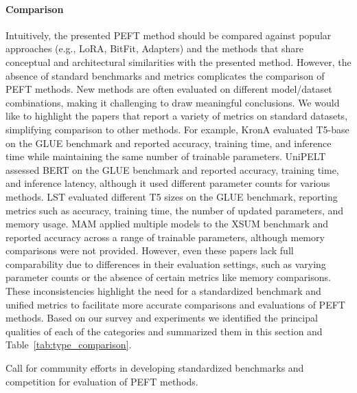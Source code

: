 \paragraph{Comparison} 
Intuitively, the presented PEFT method should be compared against popular approaches (e.g., LoRA, BitFit, Adapters) and the methods that share conceptual and architectural similarities with the presented method. However, the absence of standard benchmarks and metrics complicates the comparison of PEFT methods. New methods are often evaluated on different model/dataset combinations, making it challenging to draw meaningful conclusions. We would like to highlight the papers that report a variety of metrics on standard datasets, simplifying comparison to other methods. For example, KronA \citep{krona} evaluated T5-base on the GLUE benchmark and reported accuracy, training time, and inference time while maintaining the same number of trainable parameters. UniPELT \citep{unipelt} assessed BERT on the GLUE benchmark and reported accuracy, training time, and inference latency, although it used different parameter counts for various methods. LST \citep{ladder_side_tuning} evaluated different T5 sizes on the GLUE benchmark, reporting metrics such as accuracy, training time, the number of updated parameters, and memory usage. MAM \citep{parallel_adapter} applied multiple models to the XSUM benchmark and reported accuracy across a range of trainable parameters, although memory comparisons were not provided. However, even these papers lack full comparability due to differences in their evaluation settings, such as varying parameter counts or the absence of certain metrics like memory comparisons. These inconsistencies highlight the need for a standardized benchmark and unified metrics to facilitate more accurate comparisons and evaluations of PEFT methods. Based on our survey and experiments we identified the principal qualities of each of the categories and summarized them in this section and Table~\ref{tab:type_comparison}.

\begin{tcolorbox}[
    colback=gray!05,  
    colframe=black!50, boxrule=0.5pt, arc=3mm,           
    width=\linewidth,  
    leftrule=0.1mm, rightrule=0.1mm, bottomrule=0.1mm, toprule=0.1mm, ] Call for community efforts in developing standardized benchmarks and competition for evaluation of PEFT methods.
\end{tcolorbox}

